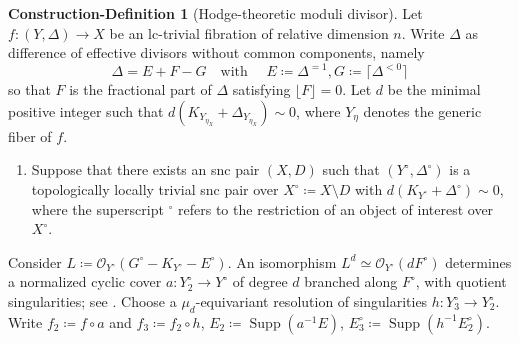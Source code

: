 \documentclass{amsart}
\DeclareMathOperator{\Supp}{Supp}
\theoremstyle{definition}
\newtheorem{constdef}[theorem]{Construction-Definition}
\theoremstyle{remark}
\numberwithin{equation}{section}
\begin{document}
 \begin{constdef}[Hodge-theoretic moduli divisor]\label{defn:modulipart}  Let $f \colon (Y, \Delta) \to X$ be an
 lc-trivial fibration of relative dimension $n$. Write $\Delta$ as  difference of effective divisors without common components, namely
 \[
 \Delta = E + F - G \quad \text{with } \quad E \coloneqq \Delta^{=1}, G \coloneqq \lceil \Delta^{< 0}\rceil
 \] 
 so that $F$ is the fractional part of $\Delta$ satisfying $\lfloor F \rfloor =0$. Let $d$ be the minimal positive integer such that 
 $d(K_{Y_{\eta_X}}+ \Delta_{Y_{\eta_X}})\sim 0$, where $Y_{\eta}$ denotes the generic fiber of $f$. 
 \begin{enumerate}
 \item[($\dagger$)]\label{eq:modulipartI} Suppose that there exists an snc pair $(X, D)$ such that $(Y^{\circ}, \Delta^{\circ})$ is a topologically locally trivial snc pair over $X^{\circ} \coloneqq X \setminus D$ with $d(K_{Y^{\circ}} + \Delta^{\circ}) \sim 0$, where the superscript ${}^{\circ}$ refers to the restriction of an object of interest over $X^{\circ}$.
 \end{enumerate}
Consider $L \coloneqq \mathcal{O}_{Y^{\circ}}(G^{\circ}-K_{Y^{\circ}}-E^{\circ})$. An isomorphism $L^{d} \simeq \mathcal{O}_{Y^{\circ}}(dF^{\circ})$
determines a normalized cyclic cover $a \colon Y^{\circ}_2 \to Y^{\circ}$ of degree $d$ branched along $F^{\circ}$, with quotient singularities; see \cite[2.49-53]{KM98}. 
Choose a $\mu_d$-equivariant resolution of singularities $h \colon Y^{\circ}_3 \to {Y}^{\circ}_2$. Write $f_2 \coloneqq f \circ a$ and $f_3 \coloneqq f_2 \circ h$, $E_2 \coloneqq \Supp (a^{-1} E)$, $E^{\circ}_3 \coloneqq \Supp (h^{-1} {E}^{\circ}_2)$. 


\end{constdef}
\end{document}
